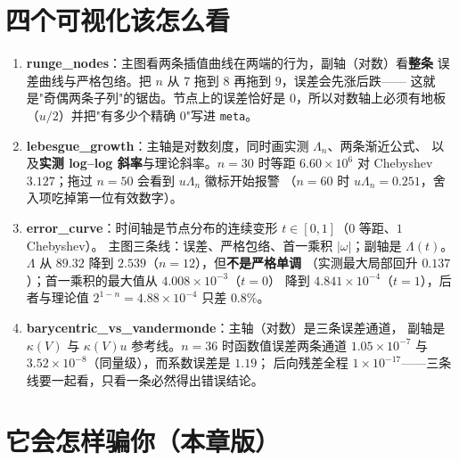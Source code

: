 \section{四个可视化该怎么看}

\begin{enumerate}
  \item \textbf{runge\_nodes}：主图看两条插值曲线在两端的行为，副轴（对数）看\textbf{整条}
        误差曲线与严格包络。把 $n$ 从 $7$ 拖到 $8$ 再拖到 $9$，误差会先涨后跌——
        这就是"奇偶两条子列"的锯齿。节点上的误差恰好是 $0$，所以对数轴上必须有地板
        （$u/2$）并把"有多少个精确 $0$"写进 \texttt{meta}。
  \item \textbf{lebesgue\_growth}：主轴是对数刻度，同时画实测 $\Lambda_n$、两条渐近公式、
        以及\textbf{实测 log--log 斜率}与理论斜率。$n=30$ 时等距 $6.60\times10^{6}$
        对 Chebyshev $3.127$；拖过 $n=50$ 会看到 $u\Lambda_n$ 徽标开始报警
        （$n=60$ 时 $u\Lambda_n=0.251$，舍入项吃掉第一位有效数字）。
  \item \textbf{error\_curve}：时间轴是节点分布的连续变形 $t\in[0,1]$（$0$ 等距、$1$ Chebyshev）。
        主图三条线：误差、严格包络、首一乘积 $|\omega|$；副轴是 $\Lambda(t)$。
        $\Lambda$ 从 $89.32$ 降到 $2.539$（$n=12$），但\textbf{不是严格单调}
        （实测最大局部回升 $0.137$）；首一乘积的最大值从 $4.008\times10^{-3}$（$t=0$）
        降到 $4.841\times10^{-4}$（$t=1$），后者与理论值 $2^{1-n}=4.88\times10^{-4}$ 只差 $0.8\%$。
  \item \textbf{barycentric\_vs\_vandermonde}：主轴（对数）是三条误差通道，
        副轴是 $\kappa(V)$ 与 $\kappa(V)u$ 参考线。$n=36$ 时函数值误差两条通道
        $1.05\times10^{-7}$ 与 $3.52\times10^{-8}$（同量级），而系数误差是 $1.19$；
        后向残差全程 $1\times10^{-17}$——三条线要一起看，只看一条必然得出错误结论。
\end{enumerate}



\section{它会怎样骗你（本章版）}

